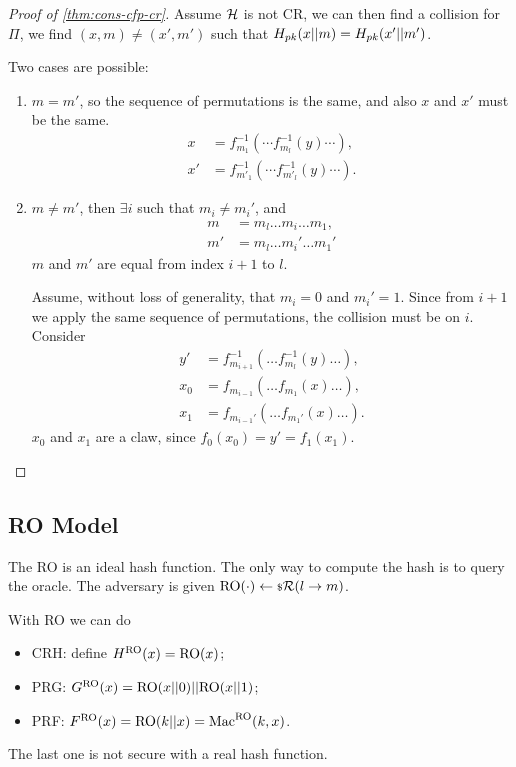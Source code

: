 \begin{proof}[Proof of \cref{thm:cons-cfp-cr}]
	Assume $\mathcal{H}$ is not \ac{CR}, we can then find a collision for $\Pi$, \ie we find $(x,m) \neq (x',m')$ such that $H_{pk}(x || m) = H_{pk} (x' || m')$.

	Two cases are possible:
	\begin{enumerate}
		\item $m = m'$, so the sequence of permutations is the same, and also $x$ and $x'$ must be the same.
			\begin{align*}
				x & = f_{m_1}^{-1}( \cdots f_{m_l}^{-1}( y) \cdots ), \\
				x' & = f_{m'_1}^{-1}( \cdots f_{m'_l}^{-1}( y) \cdots ).
			\end{align*}
		\item $m \neq m'$, then $\exists i$ such that $m_i \neq m_i'$, and
			\begin{align*}
				m & = m_l \dots m_i \dots m_1, \\
				m' & = m_l \dots m_i' \dots m_1'
			\end{align*}
			\ie $m$ and $m'$ are equal from index $i+1$ to $l$.

			Assume, without loss of generality, that $m_i = 0$ and $m_i' = 1$.
			Since from $i+1$ we apply the same sequence of permutations, the collision must be on $i$.
			Consider
			\begin{align*}
				y' & = f_{m_{i+1}}^{-1}( \dots f_{m_l}^{-1} (y) \dots), \\
				x_0 & = f_{m_{i-1}} (\dots f_{m_1} (x) \dots ), \\
				x_1 & = f_{m_{i-1}'} (\dots f_{m_1'} (x) \dots ).
			\end{align*}
			$x_0$ and $x_1$ are a claw, since $f_0(x_0) = y' = f_1(x_1)$. \qedhere
	\end{enumerate}
\end{proof}

\subsection{\acl{RO} Model}

The \ac{RO} is an ideal hash function.
The only way to compute the hash is to query the oracle.
The adversary is given $\mathrm{RO}(\cdot) \leftarrow {\scriptstyle \$} {\mathcal{R}(l \to m)}$.

With \ac{RO} we can do
\begin{itemize}
	\item \ac{CRH}: define $H^{\mathrm{RO}}(x) = \mathrm{RO}(x)$;
	\item \ac{PRG}: $G^{\mathrm{RO}}(x) = \mathrm{RO}(x || 0) || \mathrm{RO}(x || 1)$;
	\item \ac{PRF}: $F^{\mathrm{RO}}(x) = \mathrm{RO}(k || x) = \mathrm{Mac}^{\mathrm{RO}}(k, x)$.
\end{itemize}
The last one is not secure with a real hash function.
